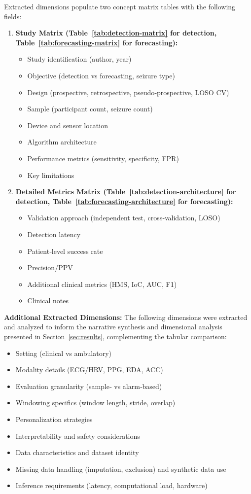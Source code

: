 Extracted dimensions populate two concept matrix tables with the following
fields:
\begin{enumerate}
  \item \textbf{Study Matrix (Table~\ref{tab:detection-matrix} for detection, Table~\ref{tab:forecasting-matrix} for forecasting):}
  \begin{itemize}
    \item Study identification (author, year)
    \item Objective (detection vs forecasting, seizure type)
    \item Design (prospective, retrospective, pseudo‑prospective, LOSO CV)
    \item Sample (participant count, seizure count)
    \item Device and sensor location
    \item Algorithm architecture
    \item Performance metrics (sensitivity, specificity, FPR)
    \item Key limitations
  \end{itemize}
  \item \textbf{Detailed Metrics Matrix (Table~\ref{tab:detection-architecture} for detection, Table~\ref{tab:forecasting-architecture} for forecasting):}
  \begin{itemize}
    \item Validation approach (independent test, cross‑validation, LOSO)
    \item Detection latency
    \item Patient‑level success rate
    \item Precision/PPV
    \item Additional clinical metrics (HMS, IoC, AUC, F1)
    \item Clinical notes
  \end{itemize}
\end{enumerate}

\noindent\textbf{Additional Extracted Dimensions:}
The following dimensions were extracted and analyzed to inform the narrative synthesis and dimensional analysis presented in Section~\ref{sec:results}, complementing the tabular comparison:
\begin{itemize}
  \item Setting (clinical vs ambulatory)
  \item Modality details (ECG/HRV, PPG, EDA, ACC)
  \item Evaluation granularity (sample‑ vs alarm‑based)
  \item Windowing specifics (window length, stride, overlap)
  \item Personalization strategies
  \item Interpretability and safety considerations
  \item Data characteristics and dataset identity
  \item Missing data handling (imputation, exclusion) and synthetic data use
  \item Inference requirements (latency, computational load, hardware)
\end{itemize}

